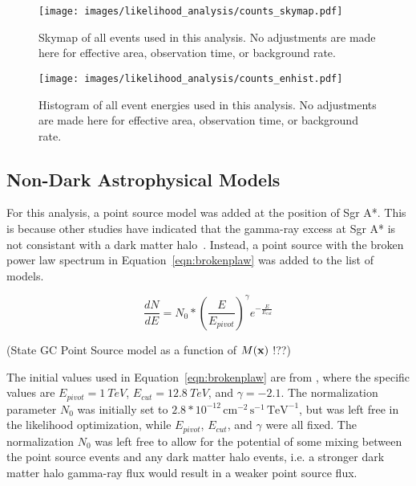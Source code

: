   \begin{figure}[ht]
    \centering
    \texttt{[image: images/likelihood\_analysis/counts\_skymap.pdf]}
    \caption[Galactic Center Counts Skymap]{
      Skymap of all events used in this analysis.
      No adjustments are made here for effective area, observation time, or background rate.
    }
    \label{fig:gc_counts_skymap}
  \end{figure}
  
  \begin{figure}[h]
    \centering
    \texttt{[image: images/likelihood\_analysis/counts\_enhist.pdf]}
    \caption[Galactic Center Counts Energy Histogram]{
      Histogram of all event energies used in this analysis.
      No adjustments are made here for effective area, observation time, or background rate.
    }
    \label{fig:gc_counts_enhist}
  \end{figure}

  \FloatBarrier

  \subsection{Non-Dark Astrophysical Models}\label{subsec:gcpointsrc}
  For this analysis, a point source model was added at the position of Sgr A*.
  This is because other studies have indicated that the gamma-ray excess at Sgr A* is not consistant with a dark matter halo~\cite{gc_pnt_is_not_dm1, gc_pnt_is_not_dm2, gc_pnt_is_not_dm3}.
  Instead, a point source with the broken power law spectrum in Equation~\ref{eqn:brokenplaw} was added to the list of models.
  
  \begin{equation}\label{eqn:brokenplaw}
    \frac{dN}{dE} = N_{0} * { \left ( \frac{E}{E_{pivot}} \right ) }^{\gamma} {e}^{-\frac{E}{E_{cut}}}
  \end{equation}

  {\color{red}(State GC Point Source model as a function of $M(\mathbf{x })$ !??)}
  
  The initial values used in Equation~\ref{eqn:brokenplaw} are from \cite{VeritasGCRidge2015}, where the specific values are $E_{pivot}=\SI{1}{TeV}$, $E_{cut}=\SI{12.8}{TeV}$, and $\gamma=-2.1$.
  The normalization parameter $N_{0}$ was initially set to $2.8*{10}^{-12}\,\text{cm}^{-2}\,\text{s}^{-1}\,\text{TeV}^{-1}$, but was left free in the likelihood optimization, while $E_{pivot}$, $E_{cut}$, and $\gamma$ were all fixed.
  The normalization $N_{0}$ was left free to allow for the potential of some mixing between the point source events and any dark matter halo events, i.e. a stronger dark matter halo gamma-ray flux would result in a weaker point source flux.
  
